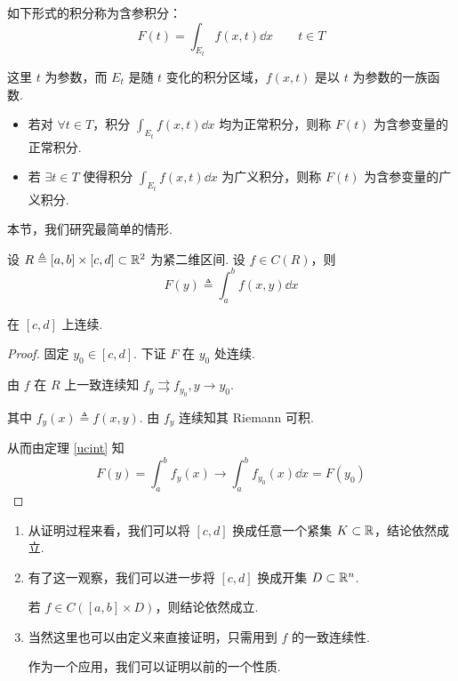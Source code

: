 
如下形式的积分称为含参积分：
$$
F(t)=\int_{E_t}f(x,t)\dd x\qquad t\in T
$$

这里 $t$ 为参数，而 $E_t$ 是随 $t$ 变化的积分区域，$f(x,t)$ 是以 $t$ 为参数的一族函数.

\begin{itemize}
    \item 若对 $\forall t\in T$，积分 $\displaystyle\int_{E_t}f(x,t)\dd x$ 均为正常积分，则称 $F(t)$ 为含参变量的正常积分.
    
    \item 若 $\exists t\in T$ 使得积分 $\displaystyle\int_{E_t}f(x,t)\dd x$ 为广义积分，则称 $F(t)$ 为含参变量的广义积分.
\end{itemize}

本节，我们研究最简单的情形.


\begin{property}
    设 $R\triangleq[a,b]\times[c,d]\subset\mathbb{R}^2$ 为紧二维区间. 设 $f\in C(R)$，则
$$
F(y)\triangleq\int_a^bf(x,y)\dd x
$$

    在 $[c,d]$ 上连续.
\end{property}
\begin{proof}
    固定 $y_0\in[c,d]$. 下证 $F$ 在 $y_0$ 处连续.

    由 $f$ 在 $R$ 上一致连续知 $f_y\rightrightarrows f_{y_0},y\to y_0$.

    其中 $f_y(x)\triangleq f(x,y)$. 由 $f_y$ 连续知其 Riemann 可积.

    从而由定理 \ref{ucint} 知
$$
F(y)=\int_a^bf_y(x)\to\int_a^bf_{y_0}(x)\dd x=F(y_0)
$$
\end{proof}

\begin{hint}
    \begin{enumerate}
        \item 从证明过程来看，我们可以将 $[c,d]$ 换成任意一个紧集 $K\subset\mathbb{R}$，结论依然成立.
        
        \item 有了这一观察，我们可以进一步将 $[c,d]$ 换成开集 $D\subset\mathbb{R}^n$.
        
        若 $f\in C([a,b]\times D)$，则结论依然成立.

        \item 当然这里也可以由定义来直接证明，只需用到 $f$ 的一致连续性.
        
        作为一个应用，我们可以证明以前的一个性质.
    \end{enumerate}
\end{hint}

